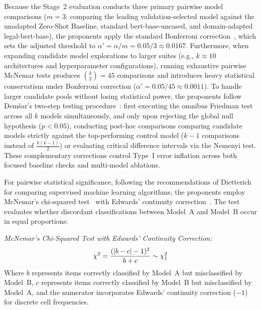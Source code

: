     Because the Stage~2 evaluation conducts three primary pairwise model comparisons ($m = 3$: comparing the leading validation-selected model against the unadapted Zero-Shot Baseline, standard bert-base-uncased, and domain-adapted legal-bert-base), the proponents apply the standard Bonferroni correction~\cite{demsar2006statistical}, which sets the adjusted threshold to $\alpha' = \alpha / m = 0.05 / 3 \approx 0.0167$. Furthermore, when expanding candidate model explorations to larger suites (e.g., $k \approx 10$ architectures and hyperparameter configurations), running exhaustive pairwise McNemar tests produces $\binom{k}{2} = 45$ comparisons and introduces heavy statistical conservatism under Bonferroni correction ($\alpha' = 0.05 / 45 \approx 0.0011$). To handle larger candidate pools without losing statistical power, the proponents follow Dem{\v{s}}ar's two-step testing procedure~\cite{demsar2006statistical}: first executing the omnibus Friedman test across all $k$ models simultaneously, and only upon rejecting the global null hypothesis ($p < 0.05$), conducting post-hoc comparisons comparing candidate models strictly against the top-performing control model ($k - 1$ comparisons instead of $\frac{k(k-1)}{2}$) or evaluating critical difference intervals via the Nemenyi test. These complementary corrections control Type~I error inflation across both focused baseline checks and multi-model ablations.

    For pairwise statistical significance, following the recommendations of Dietterich~\cite{dietterich1998approximate} for comparing supervised machine learning algorithms, the proponents employ McNemar's chi-squared test~\cite{mcnemar1947note} with Edwards' continuity correction~\cite{edwards1948note}. The test evaluates whether discordant classifications between Model~A and Model~B occur in equal proportions:

    \noindent\textit{McNemar's Chi-Squared Test with Edwards' Continuity Correction:}
    \begin{equation}
        \chi^2 = \frac{(|b - c| - 1)^2}{b + c} \sim \chi^2_1
        \label{eq:mcnemar_test}
        \eqcaption{McNemar's Chi-Squared Test with Edwards' Continuity Correction}
    \end{equation}
    \noindent Where $b$ represents items correctly classified by Model~A but misclassified by Model~B, $c$ represents items correctly classified by Model~B but misclassified by Model~A, and the numerator incorporates Edwards' continuity correction ($-1$) for discrete cell frequencies.


